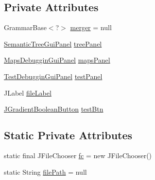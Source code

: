 \subsection*{Private Attributes}
\begin{DoxyCompactItemize}
\item 
Grammar\-Base$<$?$>$ \hyperlink{classit_1_1emarolab_1_1cagg_1_1debugging_1_1baseComponents_1_1DeserialisationGui_abcc08b9d27ccfd56afd93532c698edb3}{merger} = null
\item 
\hyperlink{classit_1_1emarolab_1_1cagg_1_1debugging_1_1baseComponents_1_1customPanel_1_1SemanticTreeGuiPanel}{Semantic\-Tree\-Gui\-Panel} \hyperlink{classit_1_1emarolab_1_1cagg_1_1debugging_1_1baseComponents_1_1DeserialisationGui_ab9050906e534ba6a751898cef343be5c}{tree\-Panel}
\item 
\hyperlink{classit_1_1emarolab_1_1cagg_1_1debugging_1_1baseComponents_1_1customPanel_1_1MapsDebugginGuiPanel}{Maps\-Debuggin\-Gui\-Panel} \hyperlink{classit_1_1emarolab_1_1cagg_1_1debugging_1_1baseComponents_1_1DeserialisationGui_aff1c04b39963b4abefad3b89518f526a}{maps\-Panel}
\item 
\hyperlink{classit_1_1emarolab_1_1cagg_1_1debugging_1_1baseComponents_1_1customPanel_1_1TestDebugginGuiPanel}{Test\-Debuggin\-Gui\-Panel} \hyperlink{classit_1_1emarolab_1_1cagg_1_1debugging_1_1baseComponents_1_1DeserialisationGui_a5827585bdffe37f8cedd0af6fddb2052}{test\-Panel}
\item 
J\-Label \hyperlink{classit_1_1emarolab_1_1cagg_1_1debugging_1_1baseComponents_1_1DeserialisationGui_a9e3d72e436cb5b9e4fdf667c7aeaf84d}{file\-Label}
\item 
\hyperlink{classit_1_1emarolab_1_1cagg_1_1debugging_1_1baseComponents_1_1JGradientBooleanButton}{J\-Gradient\-Boolean\-Button} \hyperlink{classit_1_1emarolab_1_1cagg_1_1debugging_1_1baseComponents_1_1DeserialisationGui_a935a69f1a8bb8153474f19980b9d8227}{test\-Btn}
\end{DoxyCompactItemize}
\subsection*{Static Private Attributes}
\begin{DoxyCompactItemize}
\item 
static final J\-File\-Chooser \hyperlink{classit_1_1emarolab_1_1cagg_1_1debugging_1_1baseComponents_1_1DeserialisationGui_aa9297271a9827471ff85e57941f50f45}{fc} = new J\-File\-Chooser()
\item 
static String \hyperlink{classit_1_1emarolab_1_1cagg_1_1debugging_1_1baseComponents_1_1DeserialisationGui_a399911d5a8594940a095db4753563a0d}{file\-Path} = null
\end{DoxyCompactItemize}


